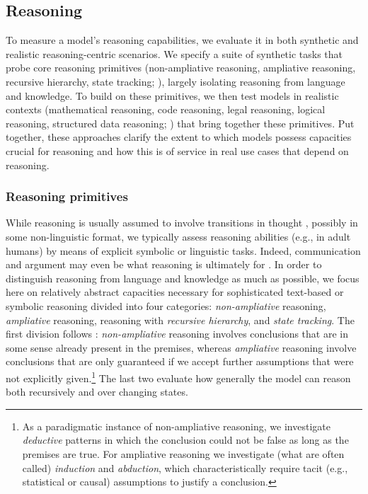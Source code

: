 \hypertarget{reasoning}{\subsection{Reasoning}}
\label{sec:reasoning}

To measure a model's reasoning capabilities, we evaluate it in both synthetic and realistic reasoning-centric scenarios.
We specify a suite of synthetic tasks that probe core reasoning primitives (non-ampliative reasoning, ampliative reasoning, recursive hierarchy, state tracking; ), largely isolating reasoning from language and knowledge. 
To build on these primitives, we then test models in realistic contexts (mathematical reasoning, code reasoning, legal reasoning, logical reasoning, structured data reasoning; ) that bring together these primitives.
Put together, these approaches clarify the extent to which models possess capacities crucial for reasoning and how this is of service in real use cases that depend on reasoning.

\subsubsection{Reasoning primitives}
\label{sec:reasoning-primitives}
While reasoning is usually assumed to involve transitions in thought \citep{HarmanRationality}, possibly in some non-linguistic format, we typically assess reasoning abilities (e.g., in adult humans) by means of explicit symbolic or linguistic tasks. Indeed, communication and argument may even be what reasoning is ultimately for \citep{MercierSperber}. 
In order to distinguish reasoning from language and knowledge as much as possible, we focus here on relatively abstract capacities necessary for sophisticated text-based or symbolic reasoning divided into four categories: \textit{non-ampliative} reasoning, \textit{ampliative} reasoning, reasoning with \textit{recursive hierarchy}, and \textit{state tracking}. 
The first division follows \citet{peirce1974collected}: \textit{non-ampliative} reasoning involves conclusions that are in some sense already present in the premises, whereas \textit{ampliative} reasoning involve conclusions that are only guaranteed if we accept further assumptions that were not explicitly given.\footnote{As a paradigmatic instance of non-ampliative reasoning, we investigate \emph{deductive} patterns in which the conclusion could not be false as long as the premises are true. For ampliative reasoning we investigate (what are often called) \emph{induction} and \emph{abduction}, which characteristically require tacit (e.g., statistical or causal) assumptions to justify a conclusion.}
The last two evaluate how generally the model can reason both recursively and over changing states.

